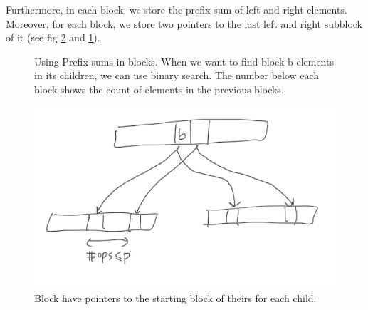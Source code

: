 \documentclass[10pt]{article}
\theoremstyle{definition}
\begin{document}
Furthermore, in each block, we store the prefix sum of left and right elements. Moreover, for each block, we store two pointers to the last left and right subblock of it (see fig \ref{fig::pointer} and \ref{fig:prefix}).

\begin{figure}
\begin{center}
\end{center}
\caption{\label{fig:prefix} Using Prefix sums in blocks. When we want to find block b elements in its children, we can use binary search. The number below each block shows the count of elements in the previous blocks.}
\end{figure}

\begin{figure}[hbt]
\centering
  \includegraphics[width=5in]{pics/pointers}
  \caption{Block have pointers to the starting block of theirs for each child. \label{fig::pointer}}
\end{figure}
\end{document}
